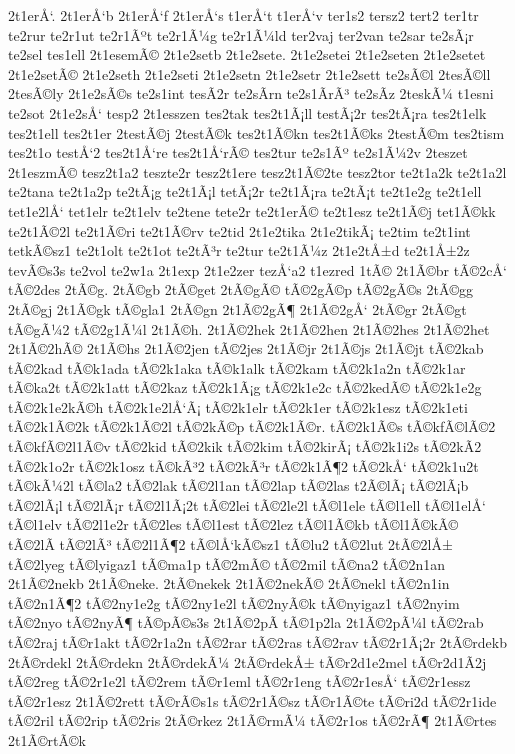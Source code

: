 {2t1erÅ‘.
2t1erÅ‘b
2t1erÅ‘f
2t1erÅ‘s
t1erÅ‘t
t1erÅ‘v
ter1s2
tersz2
tert2
ter1tr
te2rur
te2r1ut
te2r1Ãºt
te2r1Ã¼g
te2r1Ã¼ld
ter2vaj
ter2van
te2sar
te2sÃ¡r
te2sel
tes1ell
2t1esemÃ©
2t1e2setb
2t1e2sete.
2t1e2setei
2t1e2seten
2t1e2setet
2t1e2setÃ©
2t1e2seth
2t1e2seti
2t1e2setn
2t1e2setr
2t1e2sett
te2sÃ©l
2tesÃ©ll
2tesÃ©ly
2t1e2sÃ©s
te2s1int
tesÃ­2r
te2sÃ­rn
te2s1Ã­rÃ³
te2sÃ­z
2teskÃ¼
t1esni
te2sot
2t1e2sÅ‘
tesp2
2t1esszen
tes2tak
tes2t1Ã¡ll
testÃ¡2r
tes2tÃ¡ra
tes2t1elk
tes2t1ell
tes2t1er
2testÃ©j
2testÃ©k
tes2t1Ã©kn
tes2t1Ã©ks
2testÃ©m
tes2tism
tes2t1o
testÅ‘2
tes2t1Å‘re
tes2t1Å‘rÃ©
tes2tur
te2s1Ãº
te2s1Ã¼2v
2teszet
2t1eszmÃ©
tesz2t1a2
teszte2r
tesz2t1ere
tesz2t1Ã©2te
tesz2tor
te2t1a2k
te2t1a2l
te2tana
te2t1a2p
te2tÃ¡g
te2t1Ã¡l
tetÃ¡2r
te2t1Ã¡ra
te2tÃ¡t
te2t1e2g
te2t1ell
tet1e2lÅ‘
tet1elr
te2t1elv
te2tene
tete2r
te2t1erÃ©
te2t1esz
te2t1Ã©j
tet1Ã©kk
te2t1Ã©2l
te2t1Ã©ri
te2t1Ã©rv
te2tid
2t1e2tika
2t1e2tikÃ¡
te2tim
te2t1int
tetkÃ©sz1
te2t1olt
te2t1ot
te2tÃ³r
te2tur
te2t1Ã¼z
2t1e2tÅ±d
te2t1Å±2z
tevÃ©s3s
te2vol
te2w1a
2t1exp
2t1e2zer
tezÅ‘a2
t1ezred
1tÃ©
2t1Ã©br
tÃ©2cÅ‘
tÃ©2des
2tÃ©g.
2tÃ©gb
2tÃ©get
2tÃ©gÃ©
tÃ©2gÃ©p
tÃ©2gÃ©s
2tÃ©gg
2tÃ©gj
2t1Ã©gk
tÃ©gla1
2tÃ©gn
2t1Ã©2gÃ¶
2t1Ã©2gÅ‘
2tÃ©gr
2tÃ©gt
tÃ©gÃ¼2
tÃ©2g1Ã¼l
2t1Ã©h.
2t1Ã©2hek
2t1Ã©2hen
2t1Ã©2hes
2t1Ã©2het
2t1Ã©2hÃ©
2t1Ã©hs
2t1Ã©2jen
tÃ©2jes
2t1Ã©jr
2t1Ã©js
2t1Ã©jt
tÃ©2kab
tÃ©2kad
tÃ©k1ada
tÃ©2k1aka
tÃ©k1alk
tÃ©2kam
tÃ©2k1a2n
tÃ©2k1ar
tÃ©ka2t
tÃ©2k1att
tÃ©2kaz
tÃ©2k1Ã¡g
tÃ©2k1e2c
tÃ©2kedÃ©
tÃ©2k1e2g
tÃ©2k1e2kÃ©h
tÃ©2k1e2lÅ‘Ã¡
tÃ©2k1elr
tÃ©2k1er
tÃ©2k1esz
tÃ©2k1eti
tÃ©2k1Ã©2k
tÃ©2k1Ã©2l
tÃ©2kÃ©p
tÃ©2k1Ã©r.
tÃ©2k1Ã©s
tÃ©kfÃ©lÃ©2
tÃ©kfÃ©2l1Ã©v
tÃ©2kid
tÃ©2kik
tÃ©2kim
tÃ©2kirÃ¡
tÃ©2k1i2s
tÃ©2kÃ­2
tÃ©2k1o2r
tÃ©2k1osz
tÃ©kÃ³2
tÃ©2kÃ³r
tÃ©2k1Ã¶2
tÃ©2kÅ‘
tÃ©2k1u2t
tÃ©kÃ¼2l
tÃ©la2
tÃ©2lak
tÃ©2l1an
tÃ©2lap
tÃ©2las
t2Ã©lÃ¡
tÃ©2lÃ¡b
tÃ©2lÃ¡l
tÃ©2lÃ¡r
tÃ©2l1Ã¡2t
tÃ©2lei
tÃ©2le2l
tÃ©l1ele
tÃ©l1ell
tÃ©l1elÅ‘
tÃ©l1elv
tÃ©2l1e2r
tÃ©2les
tÃ©l1est
tÃ©2lez
tÃ©l1Ã©kb
tÃ©l1Ã©kÃ©
tÃ©2lÃ­
tÃ©2lÃ³
tÃ©2l1Ã¶2
tÃ©lÅ‘kÃ©sz1
tÃ©lu2
tÃ©2lut
2tÃ©2lÅ±
tÃ©2lyeg
tÃ©lyigaz1
tÃ©ma1p
tÃ©2mÃ©
tÃ©2mil
tÃ©na2
tÃ©2n1an
2t1Ã©2nekb
2t1Ã©neke.
2tÃ©nekek
2t1Ã©2nekÃ©
2tÃ©nekl
tÃ©2n1in
tÃ©2n1Ã¶2
tÃ©2ny1e2g
tÃ©2ny1e2l
tÃ©2nyÃ©k
tÃ©nyigaz1
tÃ©2nyim
tÃ©2nyo
tÃ©2nyÃ¶
tÃ©pÃ©s3s
2t1Ã©2pÃ­
tÃ©1p2la
2t1Ã©2pÃ¼l
tÃ©2rab
tÃ©2raj
tÃ©r1akt
tÃ©2r1a2n
tÃ©2rar
tÃ©2ras
tÃ©2rav
tÃ©2r1Ã¡2r
2tÃ©rdekb
2tÃ©rdekl
2tÃ©rdekn
2tÃ©rdekÃ¼
2tÃ©rdekÅ±
tÃ©r2d1e2mel
tÃ©r2d1Ã­2j
tÃ©2reg
tÃ©2r1e2l
tÃ©2rem
tÃ©r1eml
tÃ©2r1eng
tÃ©2r1esÅ‘
tÃ©2r1essz
tÃ©2r1esz
2t1Ã©2rett
tÃ©rÃ©s1s
tÃ©2r1Ã©sz
tÃ©r1Ã©te
tÃ©ri2d
tÃ©2r1ide
tÃ©2ril
tÃ©2rip
tÃ©2ris
2tÃ©rkez
2t1Ã©rmÃ¼
tÃ©2r1os
tÃ©2rÃ¶
2t1Ã©rtes
2t1Ã©rtÃ©k
}
